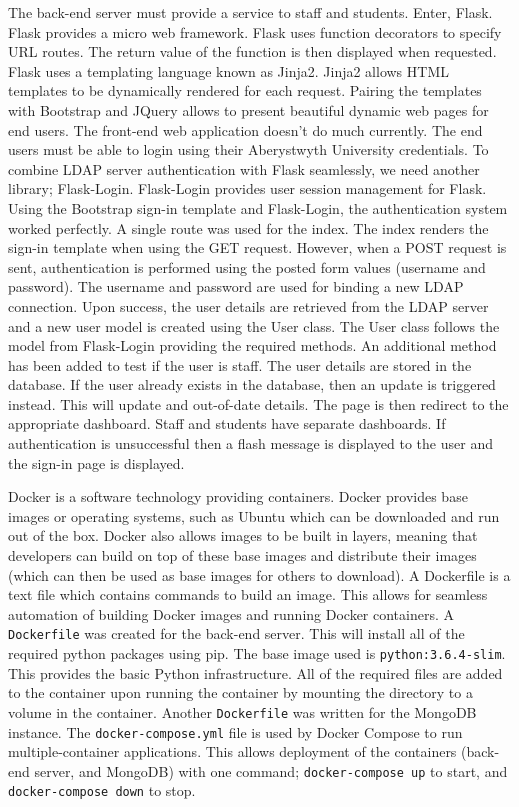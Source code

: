 The back-end server must provide a service to staff and students. Enter, Flask. Flask provides a micro web framework. Flask uses function decorators to specify URL routes. The return value of the function is then displayed when requested. Flask uses a templating language known as Jinja2. Jinja2 allows HTML templates to be dynamically rendered for each request. Pairing the templates with Bootstrap and JQuery allows to present beautiful dynamic web pages for end users. The front-end web application doesn't do much currently. The end users must be able to login using their Aberystwyth University credentials. To combine LDAP server authentication with Flask seamlessly, we need another library; Flask-Login. Flask-Login provides user session management for Flask. Using the Bootstrap sign-in template\cite{BootstrapSignInTemplate} and Flask-Login, the authentication system worked perfectly. A single route was used for the index. The index renders the sign-in template when using the GET request. However, when a POST request is sent, authentication is performed using the posted form values (username and password). The username and password are used for binding a new LDAP connection. Upon success, the user details are retrieved from the LDAP server and a new user model is created using the User class. The User class follows the model from Flask-Login providing the required methods. An additional method has been added to test if the user is staff. The user details are stored in the database. If the user already exists in the database, then an update is triggered instead. This will update and out-of-date details. The page is then redirect to the appropriate dashboard. Staff and students have separate dashboards. If authentication is unsuccessful then a flash message is displayed to the user and the sign-in page is displayed.

Docker is a software technology providing containers. Docker provides base images or operating systems, such as Ubuntu which can be downloaded and run out of the box. Docker also allows images to be built in layers, meaning that developers can build on top of these base images and distribute their images (which can then be used as base images for others to download). A Dockerfile is a text file which contains commands to build an image. This allows for seamless automation of building Docker images and running Docker containers. A \texttt{Dockerfile} was created for the back-end server. This will install all of the required python packages using pip. The base image used is \texttt{python:3.6.4-slim}. This provides the basic Python infrastructure. All of the required files are added to the container upon running the container by mounting the directory to a volume in the container. Another \texttt{Dockerfile} was written for the MongoDB instance. The \texttt{docker-compose.yml} file is used by Docker Compose to run multiple-container applications. This allows deployment of the containers (back-end server, and MongoDB) with one command; \texttt{docker-compose up} to start, and \texttt{docker-compose down} to stop.

